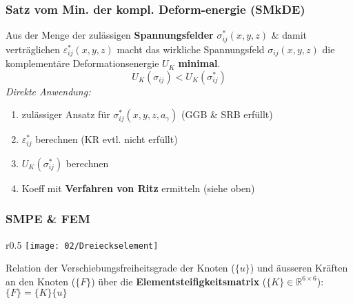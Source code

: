         \subsubsection{Satz vom Min. der kompl. Deform-energie (SMkDE)}
            Aus der Menge der zulässigen \textbf{Spannungsfelder} $\sigma_{ij}^*(x,y,z)$ \& damit verträglichen $\varepsilon_{ij}^*(x,y,z)$ macht das wirkliche Spannungsfeld $\sigma_{ij}(x,y,z)$ die komplementäre Deformationsenergie $U_K$ \textbf{minimal}. 
            \[U_K(\sigma_{ij}) < U_K(\sigma_{ij}^*)\]
            \textit{Direkte Anwendung:}
            \begin{enumerate}
                \item zulässiger Ansatz für $\sigma_{ij}^*(x,y,z,a_{\gamma})$ (GGB \& SRB erfüllt) 
                \item $\varepsilon_{ij}^*$ berechnen (KR evtl. nicht erfüllt)
                \item $U_K(\sigma_{ij}^*)$ berechnen
                \item Koeff mit \textbf{Verfahren von Ritz} ermitteln (siehe oben)
            \end{enumerate}
            
        \subsubsection{SMPE \& FEM}
            \begin{wrapfigure}[5]{r}{0.5\linewidth}
                \vspace{-2mm}
                \texttt{[image: 02/Dreieckselement]}
            \end{wrapfigure}
            Relation der Verschiebungsfreiheitsgrade der Knoten ($\{u\}$) und äusseren Kräften an den Knoten ($\{F\}$) über die \textbf{Elementsteifigkeitsmatrix} ($\{K\}\in\mathbb{R}^{6\times6}$): $\{F\}=\{K\}\{u\}$\\\\
            
